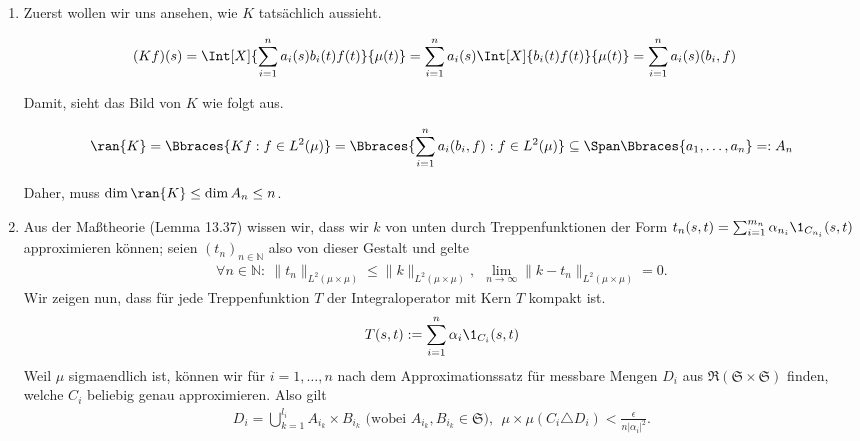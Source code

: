 \begin{solution}

\phantom{}

\begin{enumerate}[label = (\alph*)]

  \item
  Zuerst wollen wir uns ansehen, wie $K$ tatsächlich aussieht.

  \begin{align*}
    (K f)(s)
    & =
    \Int[X]
    {
      \sum_{i=1}^n
      a_i(s) b_i(t) f(t)
    }{\mu(t)}
    =
    \sum_{i=1}^n
    a_i(s) \Int[X]{b_i(t) f(t)}{\mu(t)}
    =
    \sum_{i=1}^n
    a_i(s) (b_i, f)
  \end{align*}

  Damit, sieht das Bild von $K$ wie folgt aus.

  \begin{align*}
    \ran{K}
    =
    \Bbraces
    {
      K f:
      f \in L^2(\mu)
    }
    =
    \Bbraces
    {
      \sum_{i=1}^n
      a_i (b_i, f):
      f \in L^2(\mu)
    }
    \subseteq
    \Span \Bbraces{a_1, \ldots, a_n}
    =: A_n
  \end{align*}

  Daher, muss $\dim \ran{K} \leq \dim{A_n} \leq n$.

  \item
Aus der Maßtheorie (Lemma 13.37) wissen wir, dass wir $k$ von unten durch Treppenfunktionen der Form $t_n(s,t) = \sum_{i=1}^{m_n} \alpha_{n_i} \1_{C_{n_i}}(s,t)$ approximieren können; seien $(t_n)_{n \in \mathbb{N}}$ also von dieser Gestalt und gelte
\begin{align*}
    \forall n \in \mathbb{N}:~ \|t_n\|_{L^2(\mu\times\mu)} \leq \|k\|_{L^2(\mu\times\mu)}, ~~\lim\limits_{n \rightarrow \infty}{\|k-t_n\|_{L^2(\mu\times\mu)}} = 0.
\end{align*}
Wir zeigen nun, dass für jede Treppenfunktion $T$ der Integraloperator mit Kern $T$ kompakt ist.
\begin{align*}
  T(s,t) := \sum_{i = 1}^n \alpha_i \1_{C_i}(s,t)
\end{align*}
Weil $\mu$ sigmaendlich ist, können wir für $i = 1,\dots,n$ nach dem Approximationssatz für messbare Mengen
$D_i$ aus $\mathfrak{R}(\mathfrak{S} \times \mathfrak{S})$ finden, welche $C_i$ beliebig genau
approximieren. Also gilt
\begin{align*}
    D_i = \bigcup_{k=1}^{l_i} A_{i_k} \times B_{i_k} \text{~(wobei~} A_{i_k}, B_{i_k} \in \mathfrak{S}), ~~\mu\times\mu(C_i \triangle D_i) < \frac{\epsilon}{n|\alpha_i|^2}.
\end{align*}


\end{enumerate}
\end{solution}
